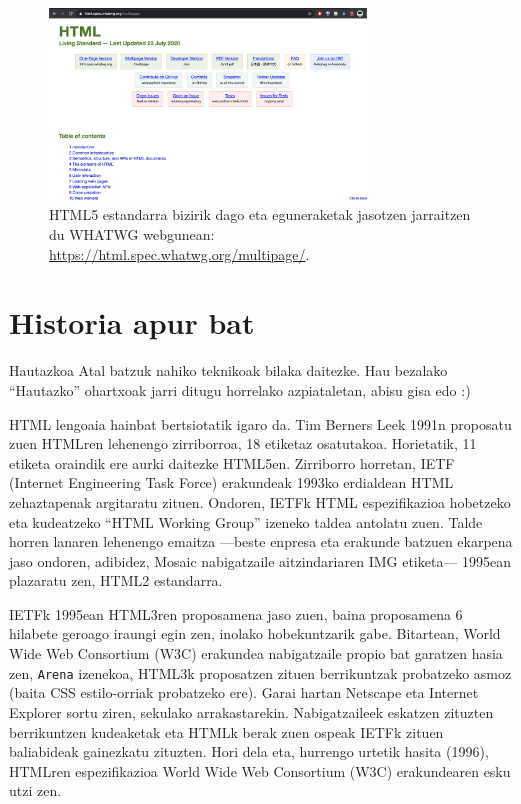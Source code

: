 \begin{figure}[ht]
	\centering
\includegraphics[trim=0cm 1cm 0cm 0cm, clip=true, width=0.75\textwidth]{img/html5standar}
\caption{HTML5 estandarra bizirik dago eta eguneraketak jasotzen jarraitzen du WHATWG webgunean: \href{https://html.spec.whatwg.org/multipage/}{https://html.spec.whatwg.org/multipage/}.}
\label{fig:quirksmode}
\end{figure}


\section{Historia apur bat}
\begin{alertinfo}{Hautazkoa}
Atal batzuk nahiko teknikoak bilaka daitezke. Hau bezalako ``Hautazko'' ohartxoak jarri ditugu horrelako azpiataletan, abisu gisa edo :)
\end{alertinfo}

HTML lengoaia hainbat bertsiotatik igaro da. Tim Berners Leek 1991n proposatu zuen HTMLren lehenengo zirriborroa, 18 etiketaz osatutakoa. Horietatik, 11 etiketa oraindik ere aurki daitezke HTML5en. Zirriborro horretan,  IETF (Internet Engineering Task Force) erakundeak 1993ko erdialdean HTML zehaztapenak argitaratu zituen. Ondoren, IETFk HTML espezifikazioa hobetzeko eta kudeatzeko 
``HTML Working Group'' izeneko taldea antolatu zuen. Talde horren lanaren lehenengo emaitza —beste enpresa eta erakunde batzuen ekarpena jaso ondoren, adibidez, Mosaic nabigatzaile aitzindariaren IMG etiketa— 1995ean plazaratu zen, HTML2 estandarra.

IETFk 1995ean HTML3ren proposamena jaso zuen, baina proposamena 6 hilabete geroago iraungi egin zen, inolako hobekuntzarik gabe. Bitartean, World Wide Web Consortium  (W3C) erakundea nabigatzaile propio bat garatzen hasia zen, \texttt{Arena} izenekoa, HTML3k proposatzen zituen berrikuntzak probatzeko asmoz (baita CSS estilo-orriak probatzeko ere). Garai hartan Netscape eta Internet Explorer sortu ziren, sekulako arrakastarekin. Nabigatzaileek eskatzen zituzten berrikuntzen kudeaketak eta HTMLk berak zuen ospeak IETFk zituen baliabideak gainezkatu zituzten. Hori dela eta, hurrengo urtetik hasita (1996), HTMLren espezifikazioa World Wide Web Consortium (W3C) erakundearen esku utzi zen.

